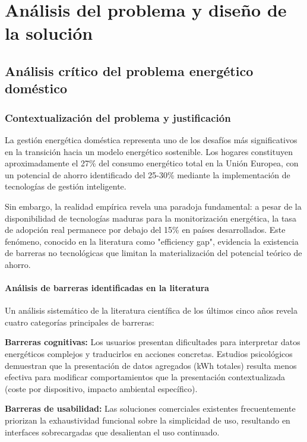 \chapter{Análisis del problema y diseño de la solución}
\label{ch:analisis}

\section{Análisis crítico del problema energético doméstico}

\subsection{Contextualización del problema y justificación}

La gestión energética doméstica representa uno de los desafíos más significativos en la transición hacia un modelo energético sostenible. Los hogares constituyen aproximadamente el 27\% del consumo energético total en la Unión Europea, con un potencial de ahorro identificado del 25-30\% mediante la implementación de tecnologías de gestión inteligente.

Sin embargo, la realidad empírica revela una paradoja fundamental: a pesar de la disponibilidad de tecnologías maduras para la monitorización energética, la tasa de adopción real permanece por debajo del 15\% en países desarrollados. Este fenómeno, conocido en la literatura como "efficiency gap", evidencia la existencia de barreras no tecnológicas que limitan la materialización del potencial teórico de ahorro.

\subsubsection{Análisis de barreras identificadas en la literatura}

Un análisis sistemático de la literatura científica de los últimos cinco años revela cuatro categorías principales de barreras:

\textbf{Barreras cognitivas:} Los usuarios presentan dificultades para interpretar datos energéticos complejos y traducirlos en acciones concretas. Estudios psicológicos demuestran que la presentación de datos agregados (kWh totales) resulta menos efectiva para modificar comportamientos que la presentación contextualizada (coste por dispositivo, impacto ambiental específico).

\textbf{Barreras de usabilidad:} Las soluciones comerciales existentes frecuentemente priorizan la exhaustividad funcional sobre la simplicidad de uso, resultando en interfaces sobrecargadas que desalientan el uso continuado.

